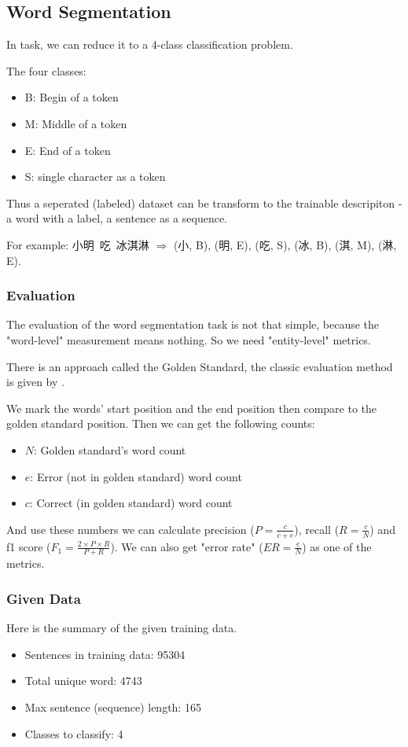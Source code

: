 \subsection{Word Segmentation}
\label{sec:cws}

In  task, we can reduce it to a 4-class classification problem.

The four classes:

\begin{itemize}
    \item B: Begin of a token
    \item M: Middle of a token
    \item E: End of a token
    \item S: single character as a token
\end{itemize}

Thus a seperated (labeled) dataset can be transform to the trainable descripiton - a word with a label, a sentence as a sequence.

For example: 小明~吃~冰淇淋 $\Rightarrow$ (小, B), (明, E), (吃, S), (冰, B), (淇, M), (淋, E).

\subsubsection*{Evaluation}
\label{sec:cws_eval}

The evaluation of the word segmentation task is not that simple, because the "word-level" measurement means nothing. So we need "entity-level" metrics.

There is an approach called the Golden Standard, the classic evaluation method is given by .

We mark the words' start position and the end position then compare to the golden standard position. Then we can get the following counts:

\begin{itemize}
    \item $N$: Golden standard's word count
    \item $e$: Error (not in golden standard) word count
    \item $c$: Correct (in golden standard) word count
\end{itemize}

And use these numbers we can calculate precision ($P=\frac{c}{c+e}$), recall ($R=\frac{c}{N}$) and f1 score ($F_1=\frac{2\times P\times R}{P+R}$). We can also get "error rate" ($ER=\frac{e}{N}$) as one of the metrics.

\subsubsection*{Given Data}

Here is the summary of the given training data.

\begin{itemize}
    \item Sentences in training data: 95304
    \item Total unique word: 4743
    \item Max sentence (sequence) length: 165
    \item Classes to classify: 4
\end{itemize}
